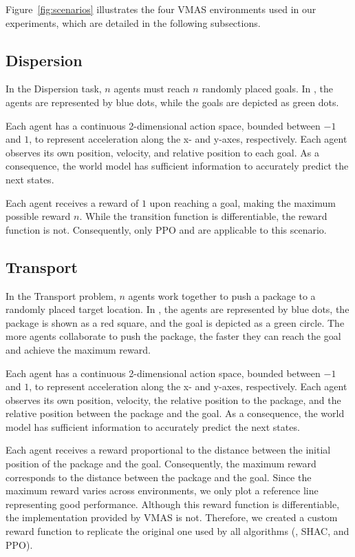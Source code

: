 Figure~\ref{fig:scenarios} illustrates the four VMAS environments used in our experiments, which are detailed in the following subsections.

\subsection{Dispersion}
In the Dispersion task, $n$ agents must reach $n$ randomly placed goals. In , the agents are represented by blue dots, while the goals are depicted as green dots.

Each agent has a continuous 2-dimensional action space, bounded between $-1$ and $1$, to represent acceleration along the x- and y-axes, respectively. Each agent observes its own position, velocity, and relative position to each goal. As a consequence, the world model has sufficient information to accurately predict the next states.

Each agent receives a reward of $1$ upon reaching a goal, making the maximum possible reward $n$. While the transition function is differentiable, the reward function is not. Consequently, only PPO and \fname{} are applicable to this scenario.

\subsection{Transport}
In the Transport problem, $n$ agents work together to push a package to a randomly placed target location. In , the agents are represented by blue dots, the package is shown as a red square, and the goal is depicted as a green circle. The more agents collaborate to push the package, the faster they can reach the goal and achieve the maximum reward.

Each agent has a continuous 2-dimensional action space, bounded between $-1$ and $1$, to represent acceleration along the x- and y-axes, respectively. Each agent observes its own position, velocity, the relative position to the package, and the relative position between the package and the goal. As a consequence, the world model has sufficient information to accurately predict the next states.

Each agent receives a reward proportional to the distance between the initial position of the package and the goal. Consequently, the maximum reward corresponds to the distance between the package and the goal. Since the maximum reward varies across environments, we only plot a reference line representing good performance. Although this reward function is differentiable, the implementation provided by VMAS is not. Therefore, we created a custom reward function to replicate the original one used by all algorithms (\fname{}, SHAC, and PPO).


